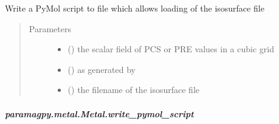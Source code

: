 \documentclass[a4paper,10pt,english]{sphinxmanual}
\begin{document}
\begin{fulllineitems}
\begin{fulllineitems}
\begin{fulllineitems}
\label{\detokenize{reference/generated/paramagpy.metal.Metal.write_isomap:paramagpy.metal.Metal.write_isomap}}
Write a PyMol script to file which allows loading of the
isosurface file
\begin{quote}\begin{description}
\item[{Parameters}] \leavevmode\begin{itemize}
\item {} 
 () \textendash{} the scalar field of PCS or PRE values in a cubic grid

\item {} 
 (\sphinxstyleliteralemphasis{\sphinxupquote{ (}}\sphinxstyleliteralemphasis{\sphinxupquote{, }}\sphinxstyleliteralemphasis{\sphinxupquote{, }}\sphinxstyleliteralemphasis{\sphinxupquote{, }}\sphinxstyleliteralemphasis{\sphinxupquote{)}}) \textendash{} as generated by {\hyperref[\detokenize{reference/generated/paramagpy.metal.Metal.make_mesh:paramagpy.metal.Metal.make_mesh}]{}}

\item {} 
 (\sphinxstyleliteralemphasis{\sphinxupquote{ (}}\sphinxstyleliteralemphasis{\sphinxupquote{)}}) \textendash{} the filename of the isosurface file

\end{itemize}

\end{description}\end{quote}

\end{fulllineitems}



\subparagraph{paramagpy.metal.Metal.write\_pymol\_script}
\label{\detokenize{reference/generated/paramagpy.metal.Metal.write_pymol_script:paramagpy-metal-metal-write-pymol-script}}\label{\detokenize{reference/generated/paramagpy.metal.Metal.write_pymol_script::doc}}


\end{fulllineitems}
\end{fulllineitems}
\end{document}
